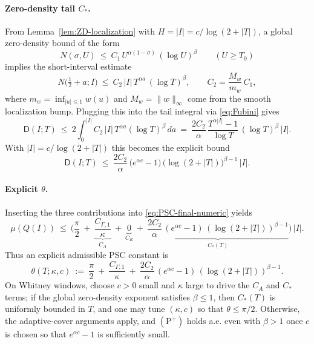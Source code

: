 \documentclass[11pt]{article}
\theoremstyle{remark}
\begin{document}
\paragraph{Zero-density tail $C_{\!*}$.}
From Lemma~\ref{lem:ZD-localization} with $H=|I|=c/\log(2+|T|)$, a global zero-density bound of the form
\[
  N(\sigma,U)\ \le\ C_1\,U^{\alpha(1-\sigma)}\,(\log U)^{\beta}\qquad (U\ge T_0)
\]
implies the short-interval estimate
\[
  N\big(\tfrac12+a; I\big)\ \le\ C_2\,|I|\,T^{\alpha a}\,(\log T)^{\beta},\qquad C_2=\frac{M_w}{m_w}\,C_1,
\]
where $m_w=\inf_{|u|\le 1}w(u)$ and $M_w=\|w\|_\infty$ come from the smooth localization bump. Plugging this into the tail integral via \eqref{eq:Fubini} gives
\[
  \mathsf D(I;T)\ \le\ 2\int_0^{|I|} C_2\,|I|\,T^{\alpha a}(\log T)^{\beta}\,da\ =\ \frac{2C_2}{\alpha}\,\frac{T^{\alpha |I|}-1}{\log T}\,(\log T)^{\beta}\,|I|.
\]
With $|I|=c/\log(2+|T|)$ this becomes the explicit bound
\begin{equation}\label{eq:Dstarexplicit}
  \mathsf D(I;T)\ \le\ \frac{2C_2}{\alpha}\,\Big(e^{\alpha c}-1\Big)\,\big(\log(2+|T|)\big)^{\beta-1}\,|I|.
\end{equation}

\paragraph{Explicit $\theta$.}
Inserting the three contributions into \eqref{eq:PSC-final-numeric} yields
\[
  \mu(Q(I))\ \le\ \Big(\frac{\pi}{2}\ +\ \underbrace{\frac{C_{\Gamma,1}}{\kappa}}_{C_A}\ +\ \underbrace{0}_{C_R}\ +\ \underbrace{\frac{2C_2}{\alpha}\,(e^{\alpha c}-1)\,(\log(2+|T|))^{\beta-1}}_{C_{\!*}(T)}\Big)\,|I|.
\]
Thus an explicit admissible PSC constant is
\[
  \theta(T;\kappa,c)\ :=\ \frac{\pi}{2}\ +\ \frac{C_{\Gamma,1}}{\kappa}\ +\ \frac{2C_2}{\alpha}\,(e^{\alpha c}-1)\,(\log(2+|T|))^{\beta-1}.
\]
On Whitney windows, choose $c>0$ small and $\kappa$ large to drive the $C_A$ and $C_{\!*}$ terms; if the global zero-density exponent satisfies $\beta\le 1$, then $C_{\!*}(T)$ is uniformly bounded in $T$, and one may tune $(\kappa,c)$ so that $\theta\le \pi/2$. Otherwise, the adaptive-cover arguments apply, and $(\mathrm P^+)$ holds a.e. even with $\beta>1$ once $c$ is chosen so that $e^{\alpha c}-1$ is sufficiently small.
\end{document}
